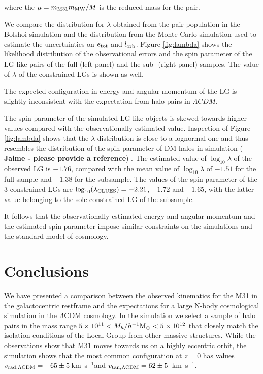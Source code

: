 \documentclass{emulateapj}
\newcommand{\kms}{\,km~s$^{-1}$}
\newcommand{\hMsun}{{\ifmmode{h^{-1}{\rm {M_{\odot}}}}\else{$h^{-1}{\rm{M_{\odot}}}$}\fi}}
\begin{document}
where the $\mu=m_{\rm M31}m_{\rm MW}/M$ is the reduced mass for the pair.


We compare the distribution for  $\lambda$ obtained from the pair
population in the Bolshoi simulation and the distribution from the  Monte Carlo
simulation used to estimate the uncertainties on $e_{\rm tot}$ and $l_{\rm orb}$. 
Figure \ref{fig:lambda} shows the likelihood distribution of the
observational errors and the spin parameter of the LG-like pairs of
the full (left panel) and the sub- (right panel) samples.  The value
of $\lambda$ of the constrained LGs is shown as well.  

The expected configuration in energy and angular momentum of the LG is
slightly inconsistent with the expectation from halo pairs in $\Lambda
CDM$.  

The spin parameter of the simulated LG-like objects is skewed towards higher values compared with the observationally estimated value. 
Inspection of Figure \ref{fig:lambda} shows that the $\lambda$
distribution is close to a lognormal one and thus resembles the
distribution of the spin parameter of DM halos in simulation ({\bf
  Jaime - please provide a reference}) .  
The estimated value of $\log_{10}\lambda$ of the observed LG is
$-1.76$, compared with the mean value of $\log_{10}\lambda$ of $-1.51$
for the full sample and $-1.38$ for the subsample. The values of the
spin parameter of the 3 constrained LGs are $\log_{10}(\lambda_{\rm
  CLUES})=-2.21$, $-1.72$ and $-1.65$, with the latter value belonging
to the sole constrained LG of the subsample.  


It follows that the observationally estimated energy and angular momentum and the estimated spin parameter impose similar constraints on the simulations and the standard model of cosmology. 



\section{Conclusions}
We have presented a comparison between the observed kinematics for the
M31 in the galactocentric restframe and the expectations for a large
N-body cosmological simulation in the $\Lambda$CDM cosmology. In the
simulation we select a sample of halo pairs in the mass range $5\times
10^{11}<M_{h}/\hMsun<5\times 10^{12}$ that closely match the isolation
conditions of the Local Group from other massive structures. While the
observations show that M31 moves towards us  on a highly eccentric orbit,
 the simulation shows that the most common configuration at $z=0$ has
 values $v_{\rm rad, \Lambda CDM}=-65\pm5$\kms and $v_{\rm tan,
   \Lambda CDM}=62\pm5$ \kms.  
\end{document}
